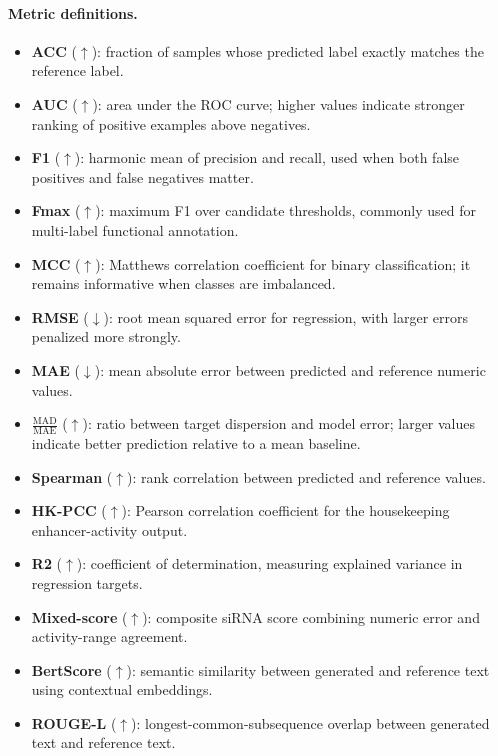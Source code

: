 \begin{appendices}
 

\paragraph{Metric definitions.}
\begin{itemize}
    \item \textbf{ACC} ($\uparrow$): fraction of samples whose predicted label exactly matches the reference label.
    \item \textbf{AUC} ($\uparrow$): area under the ROC curve; higher values indicate stronger ranking of positive examples above negatives.
    \item \textbf{F1} ($\uparrow$): harmonic mean of precision and recall, used when both false positives and false negatives matter.
    \item \textbf{Fmax} ($\uparrow$): maximum F1 over candidate thresholds, commonly used for multi-label functional annotation.
    \item \textbf{MCC} ($\uparrow$): Matthews correlation coefficient for binary classification; it remains informative when classes are imbalanced.
    \item \textbf{RMSE} ($\downarrow$): root mean squared error for regression, with larger errors penalized more strongly.
    \item \textbf{MAE} ($\downarrow$): mean absolute error between predicted and reference numeric values.
    \item \textbf{$\frac{\text{MAD}}{\text{MAE}}$} ($\uparrow$): ratio between target dispersion and model error; larger values indicate better prediction relative to a mean baseline.
    \item \textbf{Spearman} ($\uparrow$): rank correlation between predicted and reference values.
    \item \textbf{HK-PCC} ($\uparrow$): Pearson correlation coefficient for the housekeeping enhancer-activity output.
    \item \textbf{R2} ($\uparrow$): coefficient of determination, measuring explained variance in regression targets.
    \item \textbf{Mixed-score} ($\uparrow$): composite siRNA score combining numeric error and activity-range agreement.
    \item \textbf{BertScore} ($\uparrow$): semantic similarity between generated and reference text using contextual embeddings.
    \item \textbf{ROUGE-L} ($\uparrow$): longest-common-subsequence overlap between generated text and reference text.

\end{itemize}
\end{appendices}
